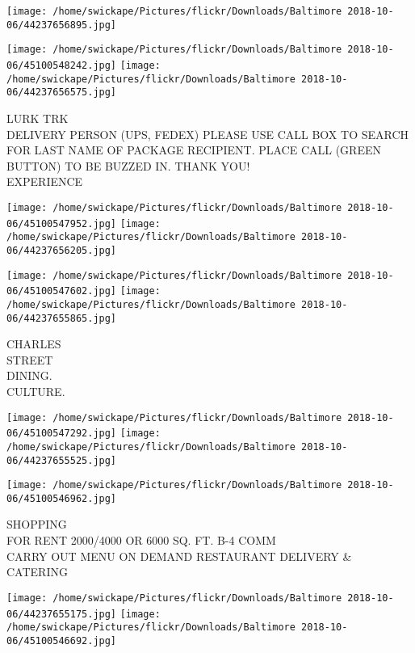 \documentclass[10pt,letterpaper]{article}
\begin{document}
\texttt{[image: /home/swickape/Pictures/flickr/Downloads/Baltimore 2018-10-06/44237656895.jpg]}

\vspace{0.25in}
\texttt{[image: /home/swickape/Pictures/flickr/Downloads/Baltimore 2018-10-06/45100548242.jpg]}
\texttt{[image: /home/swickape/Pictures/flickr/Downloads/Baltimore 2018-10-06/44237656575.jpg]}

LURK TRK\\
DELIVERY PERSON (UPS, FEDEX) PLEASE USE CALL BOX TO SEARCH FOR LAST NAME OF PACKAGE RECIPIENT.  PLACE CALL (GREEN BUTTON) TO BE BUZZED IN.  THANK YOU!\\
EXPERIENCE\\
\pagebreak

\texttt{[image: /home/swickape/Pictures/flickr/Downloads/Baltimore 2018-10-06/45100547952.jpg]}
\texttt{[image: /home/swickape/Pictures/flickr/Downloads/Baltimore 2018-10-06/44237656205.jpg]}

\texttt{[image: /home/swickape/Pictures/flickr/Downloads/Baltimore 2018-10-06/45100547602.jpg]}
\texttt{[image: /home/swickape/Pictures/flickr/Downloads/Baltimore 2018-10-06/44237655865.jpg]}

CHARLES\\
STREET\\
DINING.\\
CULTURE.\\
\pagebreak

\texttt{[image: /home/swickape/Pictures/flickr/Downloads/Baltimore 2018-10-06/45100547292.jpg]}
\texttt{[image: /home/swickape/Pictures/flickr/Downloads/Baltimore 2018-10-06/44237655525.jpg]}

\vspace{0.25in}
\texttt{[image: /home/swickape/Pictures/flickr/Downloads/Baltimore 2018-10-06/45100546962.jpg]}

SHOPPING\\
FOR RENT 2000/4000 OR 6000 SQ. FT. B{-}4 COMM\\
CARRY OUT MENU ON DEMAND RESTAURANT DELIVERY \& CATERING\\
\pagebreak

\texttt{[image: /home/swickape/Pictures/flickr/Downloads/Baltimore 2018-10-06/44237655175.jpg]}
\texttt{[image: /home/swickape/Pictures/flickr/Downloads/Baltimore 2018-10-06/45100546692.jpg]}
\end{document}
